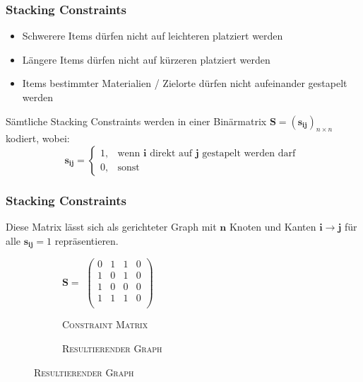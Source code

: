 \documentclass{beamer}
\begin{document}
\begin{frame}
\frametitle{Stacking Constraints}
\begin{itemize}
    \item Schwerere Items dürfen nicht auf leichteren platziert werden
    \item Längere Items dürfen nicht auf kürzeren platziert werden
    \item Items bestimmter Materialien / Zielorte dürfen nicht aufeinander gestapelt werden\newline
\end{itemize}
Sämtliche Stacking Constraints werden in einer Binärmatrix $\boldsymbol{S} = (\boldsymbol{s_{ij}})_{n \times n}$ kodiert, wobei:
\[
    \boldsymbol{s_{ij}} =
\begin{cases}
    1, & \text{wenn $\boldsymbol{i}$ direkt auf $\boldsymbol{j}$ gestapelt werden darf }\\
    0, & \text{sonst}
\end{cases}
\]
\end{frame}

\begin{frame}
\frametitle{Stacking Constraints}
Diese Matrix lässt sich als gerichteter Graph mit $\boldsymbol{n}$ Knoten \newline und Kanten $\boldsymbol{i} \rightarrow \boldsymbol{j}$ für alle $\boldsymbol{s_{ij}} = 1$ repräsentieren.\newline

\begin{figure}[H]
  \begin{subfigure}[b]{0.45\textwidth}
  \centering
    $\boldsymbol{S} =$
    $\left(
    \begin{array}{rrrr}
    0 & 1 & 1 & 0 \\
    1 & 0 & 1 & 0 \\
    1 & 0 & 0 & 0 \\
    1 & 1 & 1 & 0 \\
    \end{array} \right) $
    \caption*{\textsc{Constraint Matrix}}
  \end{subfigure}
  \hfill
  \begin{subfigure}[b]{0.45\textwidth}
  \centering
    \caption*{\textsc{Resultierender Graph}}
  \end{subfigure}
  \newline
\end{figure}
\end{frame}
\end{document}
